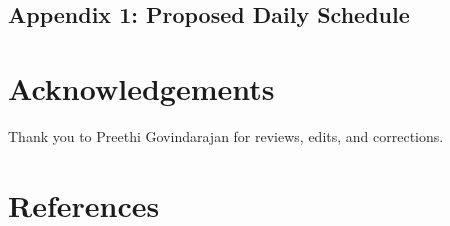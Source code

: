 \documentclass[a4paper, amsfonts, amssymb, amsmath, reprint, showkeys, nofootinbib, twoside]{revtex4-1}
\begin{document}
\subsection{Appendix 1: Proposed Daily Schedule}

\section*{Acknowledgements}

Thank you to Preethi Govindarajan for reviews, edits, and corrections.


\section*{References}

{}


% 
\end{document}
